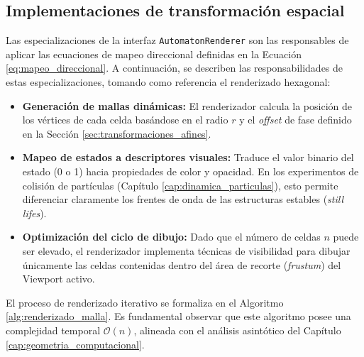 \subsection{Implementaciones de transformación espacial}

Las especializaciones de la interfaz \texttt{AutomatonRenderer} son las responsables de aplicar las ecuaciones de mapeo direccional definidas en la Ecuación \eqref{eq:mapeo_direccional}. A continuación, se describen las responsabilidades de estas especializaciones, tomando como referencia el renderizado hexagonal:

\begin{itemize}
    \item \textbf{Generación de mallas dinámicas:} El renderizador calcula la posición de los vértices de cada celda basándose en el radio $r$ y el \textit{offset} de fase definido en la Sección \ref{sec:transformaciones_afines}.
    \item \textbf{Mapeo de estados a descriptores visuales:} Traduce el valor binario del estado (0 o 1) hacia propiedades de color y opacidad. En los experimentos de colisión de partículas (Capítulo \ref{cap:dinamica_particulas}), esto permite diferenciar claramente los frentes de onda de las estructuras estables (\textit{still lifes}).
    \item \textbf{Optimización del ciclo de dibujo:} Dado que el número de celdas $n$ puede ser elevado, el renderizador implementa técnicas de visibilidad para dibujar únicamente las celdas contenidas dentro del área de recorte (\textit{frustum}) del Viewport activo.
\end{itemize}

El proceso de renderizado iterativo se formaliza en el Algoritmo \ref{alg:renderizado_malla}. Es fundamental observar que este algoritmo posee una complejidad temporal $\mathcal{O}(n)$, alineada con el análisis asintótico del Capítulo \ref{cap:geometria_computacional}.

